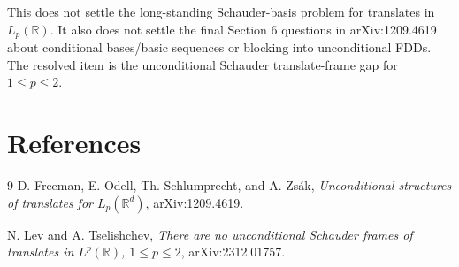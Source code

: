 \documentclass[11pt]{amsart}
\begin{document}
This does not settle the long-standing Schauder-basis problem for translates
in \(L_p(\mathbb R)\).  It also does not settle the final Section 6 questions
in arXiv:1209.4619 about conditional bases/basic sequences or blocking into
unconditional FDDs.  The resolved item is the unconditional Schauder
translate-frame gap for \(1\le p\le2\).

\section*{References}

\begin{thebibliography}{9}
D. Freeman, E. Odell, Th. Schlumprecht, and A. Zs\'ak,
\emph{Unconditional structures of translates for \(L_p(\mathbb R^d)\)},
arXiv:1209.4619.

N. Lev and A. Tselishchev,
\emph{There are no unconditional Schauder frames of translates in
\(L^p(\mathbb R)\), \(1\le p\le2\)},
arXiv:2312.01757.
\end{thebibliography}
\end{document}
